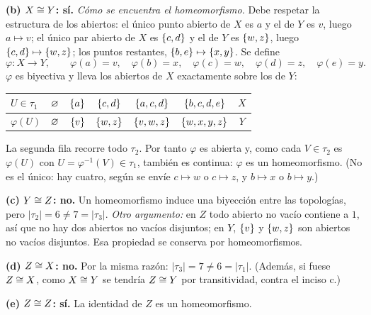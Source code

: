 \textbf{(b) $X\cong Y$: sí.} \emph{Cómo se encuentra el homeomorfismo.} Debe respetar la estructura de los abiertos:
el único punto abierto de $X$ es $a$ y el de $Y$ es $v$, luego $a\mapsto v$; el único par abierto de $X$ es $\{c,d\}$
y el de $Y$ es $\{w,z\}$, luego $\{c,d\}\mapsto\{w,z\}$; los puntos restantes, $\{b,e\}\mapsto\{x,y\}$. Se define
\[
\varphi:X\to Y,\qquad \varphi(a)=v,\quad \varphi(b)=x,\quad \varphi(c)=w,\quad \varphi(d)=z,\quad \varphi(e)=y .
\]
$\varphi$ es biyectiva y lleva los abiertos de $X$ exactamente sobre los de $Y$:
\begin{center}\small\renewcommand{\arraystretch}{1.2}
\begin{tabular}{@{}lcccccc@{}}\toprule
$U\in\tau_1$ & $\varnothing$ & $\{a\}$ & $\{c,d\}$ & $\{a,c,d\}$ & $\{b,c,d,e\}$ & $X$\\ \midrule
$\varphi(U)$ & $\varnothing$ & $\{v\}$ & $\{w,z\}$ & $\{v,w,z\}$ & $\{w,x,y,z\}$ & $Y$\\ \bottomrule
\end{tabular}\end{center}
La segunda fila recorre todo $\tau_2$. Por tanto $\varphi$ es abierta y, como cada $V\in\tau_2$ es $\varphi(U)$ con
$U=\varphi^{-1}(V)\in\tau_1$, también es continua: $\varphi$ es un homeomorfismo. (No es el único: hay cuatro, según
se envíe $c\mapsto w$ o $c\mapsto z$, y $b\mapsto x$ o $b\mapsto y$.)

\textbf{(c) $Y\cong Z$: no.} Un homeomorfismo induce una biyección entre las topologías, pero $|\tau_2|=6\neq7=|\tau_3|$.
\emph{Otro argumento:} en $Z$ todo abierto no vacío contiene a $1$, así que no hay dos abiertos no vacíos disjuntos;
en $Y$, $\{v\}$ y $\{w,z\}$ son abiertos no vacíos disjuntos. Esa propiedad se conserva por homeomorfismos.

\textbf{(d) $Z\cong X$: no.} Por la misma razón: $|\tau_3|=7\neq6=|\tau_1|$. (Además, si fuese $Z\cong X$, como
$X\cong Y$ se tendría $Z\cong Y$ por transitividad, contra el inciso c.)

\textbf{(e) $Z\cong Z$: sí.} La identidad de $Z$ es un homeomorfismo.


